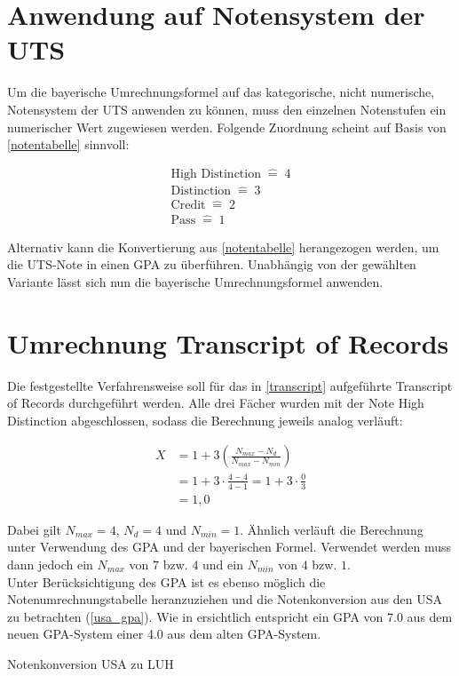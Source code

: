 \documentclass[12pt]{scrartcl}
\begin{document}
\section{Anwendung auf Notensystem der UTS}
Um die bayerische Umrechnungsformel auf das kategorische, nicht numerische, Notensystem der UTS anwenden zu können, muss den einzelnen Notenstufen ein numerischer Wert zugewiesen werden. Folgende Zuordnung scheint auf Basis von \autoref{notentabelle} sinnvoll:

\begin{gather*}
    \textrm{High Distinction} \; \widehat{=} \; 4\\
    \textrm{Distinction} \; \widehat{=} \; 3\\
    \textrm{Credit} \; \widehat{=} \; 2\\
    \textrm{Pass} \; \widehat{=} \; 1
\end{gather*}

Alternativ kann die Konvertierung aus \autoref{notentabelle} herangezogen werden, um die UTS-Note in einen GPA zu überführen.
Unabhängig von der gewählten Variante lässt sich nun die bayerische Umrechnungsformel anwenden.
\newpage

\section{Umrechnung Transcript of Records}
Die festgestellte Verfahrensweise soll für das in \autoref{transcript} aufgeführte Transcript of Records durchgeführt werden. Alle drei Fächer wurden mit der Note High Distinction abgeschlossen, sodass die Berechnung jeweils analog verläuft:

\begin{align*}
    X &= 1 + 3 \left(\frac{N_{max}-N_d}{N_{max}-N_{min}}\right)\\
      &= 1 + 3 \cdot \frac{4-4}{4-1} = 1 + 3 \cdot \frac{0}{3}\\ 
      &= 1,0 
\end{align*}

Dabei gilt $N_{max} = 4$, $N_d = 4$ und $N_{min} = 1$. Ähnlich verläuft die Berechnung unter Verwendung des GPA und der bayerischen Formel. Verwendet werden muss dann jedoch ein $N_{max}$ von $7$ bzw. $4$ und ein $N_{min}$ von $4$ bzw. $1$. \cite{LUHNotenumrechnung}\cite{GPA}\\
 Unter Berücksichtigung des GPA ist es ebenso möglich die Notenumrechnungstabelle heranzuziehen und die Notenkonversion aus den USA zu betrachten (\autoref{usa_gpa}). Wie in \cite{GPA} ersichtlich entspricht ein GPA von 7.0 aus dem neuen GPA-System einer 4.0 aus dem alten GPA-System. 
 \begin{table}[!ht]
 	\centering
 	\caption{Notenkonversion USA zu LUH}
 	\label{usa_gpa}
 \end{table}
 
\end{document}
